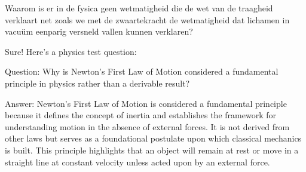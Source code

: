 
\begin{exercise}



Waarom is er in de fysica geen wetmatigheid die de wet van de traagheid verklaart net zoals we met de zwaartekracht de wetmatigheid dat lichamen in vacu\"um eenparig versneld vallen kunnen verklaren?

\begin{oplossing}
Sure! Here’s a physics test question:

Question:
Why is Newton’s First Law of Motion considered a fundamental principle in physics rather than a derivable result?

Answer:
Newton’s First Law of Motion is considered a fundamental principle because it defines the concept of inertia and establishes the framework for understanding motion in the absence of external forces. It is not derived from other laws but serves as a foundational postulate upon which classical mechanics is built. This principle highlights that an object will remain at rest or move in a straight line at constant velocity unless acted upon by an external force.

\end{oplossing}

\end{exercise}
